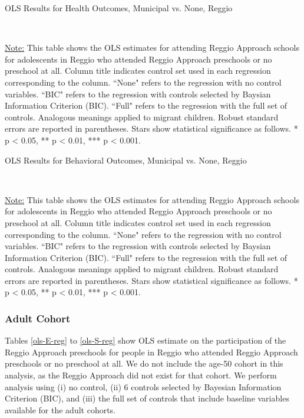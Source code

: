\begin{table}[H] \caption{OLS Results for Health Outcomes, Municipal vs. None, Reggio} \label{ols-H-adol-reg}

\vspace{1ex} \\
\footnotesize\raggedright{\underline{Note:} This table shows the OLS estimates for attending Reggio Approach schools for adolescents in Reggio who attended Reggio Approach preschools or no preschool at all. Column title indicates control set used in each regression corresponding to the column. ``None" refers to the regression with no control variables. ``BIC" refers to the regression with controls selected by Baysian Information Criterion (BIC). ``Full" refers to the regression with the full set of controls. Analogous meanings applied to migrant children. Robust standard errors are reported in parentheses. Stars show statistical significance as follows. * p < 0.05, ** p < 0.01, *** p < 0.001.}
\end{table}

\begin{table}[H] \caption{OLS Results for Behavioral Outcomes, Municipal vs. None, Reggio} \label{ols-B-adol-reg}

\vspace{1ex} \\
\footnotesize\raggedright{\underline{Note:} This table shows the OLS estimates for attending Reggio Approach schools for adolescents in Reggio who attended Reggio Approach preschools or no preschool at all. Column title indicates control set used in each regression corresponding to the column. ``None" refers to the regression with no control variables. ``BIC" refers to the regression with controls selected by Baysian Information Criterion (BIC). ``Full" refers to the regression with the full set of controls. Analogous meanings applied to migrant children. Robust standard errors are reported in parentheses. Stars show statistical significance as follows. * p < 0.05, ** p < 0.01, *** p < 0.001.}
\end{table}


\subsubsection{Adult Cohort}
Tables \ref{ols-E-reg} to \ref{ols-S-reg} show OLS estimate on the participation of the Reggio Approach preschools for people in Reggio who attended Reggio Approach preschools or no preschool at all. We do not include the age-50 cohort in this analysis, as the Reggio Approach did not exist for that cohort. We perform analysis using (i) no control, (ii) 6 controls selected by Bayesian Information Criterion (BIC), and (iii) the full set of controls that include baseline variables available for the adult cohorts. 

